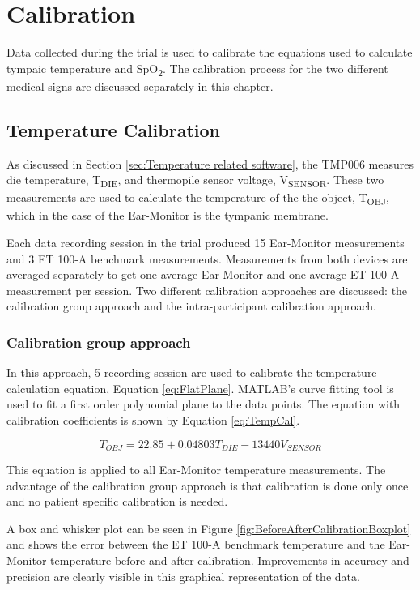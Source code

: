 \chapter{Calibration}
\label{chp:Calibration}
Data collected during the trial is used to calibrate the equations used to calculate tympaic temperature and SpO\textsubscript{2}. The calibration process for the two different medical signs are discussed separately in this chapter.

\section{Temperature Calibration}
As discussed in Section \ref{sec:Temperature related software}, the TMP006 measures die temperature, T\textsubscript{DIE}, and thermopile sensor voltage, V\textsubscript{SENSOR}. These two measurements are used to calculate the temperature of the the object, T\textsubscript{OBJ}, which in the case of the Ear-Monitor is the tympanic membrane.

\medskip

Each data recording session in the trial produced 15 Ear-Monitor measurements and 3 ET 100-A benchmark measurements. Measurements from both devices are averaged separately to get one average Ear-Monitor and one average ET 100-A measurement per session. Two different calibration approaches are discussed: the calibration group approach and the intra-participant calibration approach.

\subsection{Calibration group approach}
In this approach, 5 recording session are used to calibrate the temperature calculation equation, Equation \ref{eq:FlatPlane}. MATLAB's curve fitting tool is used to fit a first order polynomial plane to the data points. The equation with calibration coefficients is shown by Equation \ref{eq:TempCal}.

\begin{equation}
\label{eq:TempCal}
T_{OBJ}=22.85+ 0.04803 T_{DIE}-13440 V_{SENSOR}
\end{equation}


This equation is applied to all Ear-Monitor temperature measurements. The advantage of the calibration group approach is that calibration is done only once and no patient specific calibration is needed.

\medskip

A box and whisker plot can be seen in Figure \ref{fig:BeforeAfterCalibrationBoxplot} and shows the error between the ET 100-A benchmark temperature and the Ear-Monitor temperature before and after calibration. Improvements in accuracy and precision are clearly visible in this graphical representation of the data.

